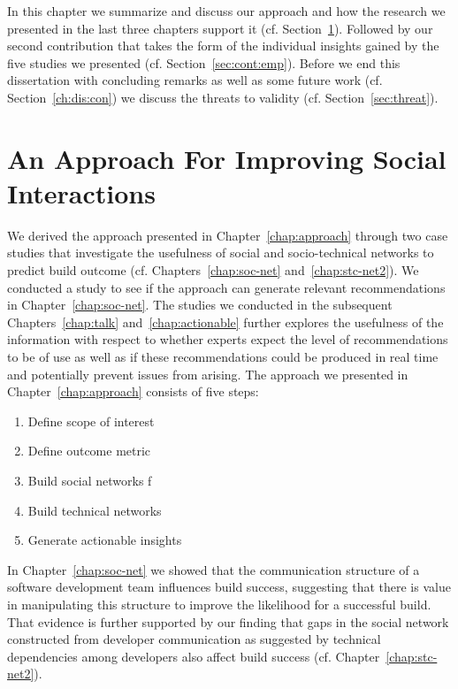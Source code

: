 \label{chap:disc}
In this chapter we summarize and discuss our approach and how the research we presented in the last three chapters support it (cf. Section~\ref{ch:dis:app}).
Followed by our second contribution that takes the form of the individual insights gained by the five studies we presented (cf. Section~\ref{sec:cont:emp}).
Before we end this dissertation with concluding remarks as well as some future work (cf. Section~\ref{ch:dis:con}) we discuss the threats to validity (cf. Section~\ref{sec:threat}).

\section{An Approach For Improving Social Interactions}
\label{ch:dis:app}
We derived the approach presented in Chapter~\ref{chap:approach} through two case studies that investigate the usefulness of social and socio-technical networks to predict build outcome (cf. Chapters~\ref{chap:soc-net} and~\ref{chap:stc-net2}).
We conducted a study to see if the approach can generate relevant recommendations in Chapter~\ref{chap:soc-net}.
The studies we conducted in the subsequent Chapters~\ref{chap:talk} and~\ref{chap:actionable} further explores the usefulness of the information with respect to whether experts expect the level of recommendations to be of use as well as if these recommendations could be produced in real time and potentially prevent issues from arising.
The approach we presented in Chapter~\ref{chap:approach} consists of five steps:

\begin{enumerate}
\item Define scope of interest
\item Define outcome metric
\item Build social networks  f
\item Build technical networks
\item Generate actionable insights
\end{enumerate}

In Chapter~\ref{chap:soc-net} we showed that the communication structure of a software development team influences build success, suggesting that there is value in manipulating this structure to improve the likelihood for a successful build.
That evidence is further supported by our finding that gaps in the social network constructed from developer communication as suggested by technical dependencies among developers also affect build success (cf. Chapter~\ref{chap:stc-net2}).

